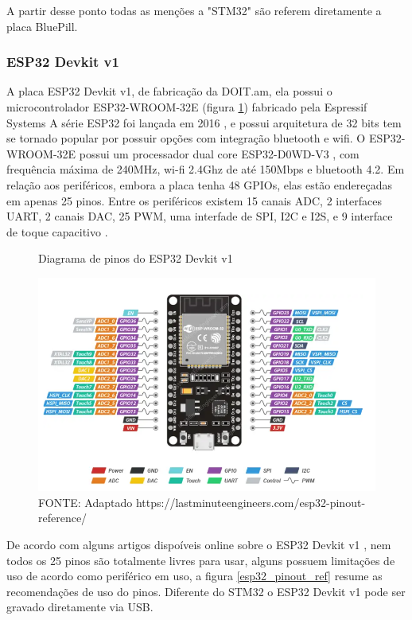A partir desse ponto todas as menções a "STM32" são referem diretamente a  placa BluePill.


\subsubsection{ESP32 Devkit v1}

A placa ESP32 Devkit v1, de fabricação da DOIT.am, ela possui o microcontrolador ESP32-WROOM-32E (figura \ref{esp32_pinout}) fabricado pela Espressif Systems
A série ESP32 foi lançada em 2016 \cite{anuncio_esp32}, e possui arquitetura de 32 bits
tem se tornado popular por possuir opções com integração bluetooth e wifi.
O ESP32-WROOM-32E possui um processador dual core ESP32-D0WD-V3 \cite{esp32_wroom_32e_datasheet}, com frequência máxima de 240MHz, wi-fi 2.4Ghz de até 150Mbps e
bluetooth 4.2. Em relação aos periféricos, embora a placa tenha 48 GPIOs, elas estão endereçadas em apenas 25 pinos.
Entre os periféricos existem 15 canais ADC, 2 interfaces UART, 
2 canais DAC, 25 PWM, uma interfade de SPI, I2C e I2S, e 9 interface de toque capacitivo \cite{esp32_reference_2} \cite{esp32_reference}.

\begin{figure}[ht]
	\centering
	\caption{Diagrama de pinos do ESP32 Devkit v1}
	\includegraphics[width=1.0\textwidth]{figures/esp32_pinout}
	\caption*{FONTE: Adaptado https://lastminuteengineers.com/esp32-pinout-reference/}
	\label{esp32_pinout}
\end{figure}

De acordo com alguns artigos dispoíveis online sobre o ESP32 Devkit v1  \cite{esp32_reference_2} \cite{esp32_reference},
nem todos os 25 pinos são totalmente livres para usar,
alguns possuem limitações de uso de acordo como periférico em uso, a figura \ref{esp32_pinout_ref} resume as recomendações de uso do pinos.
Diferente do STM32 o ESP32 Devkit v1 pode ser gravado diretamente via USB.


